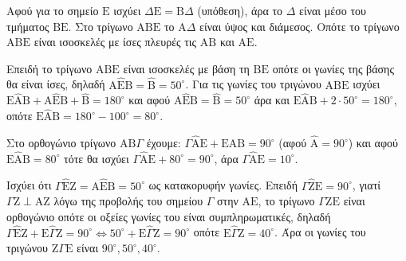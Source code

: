 \begin{alist}
    \item 
    \begin{rlist}
        \item Αφού για το σημείο $\mathrm{E}$ ισχύει $\Delta\mathrm{E} = \mathrm{B}\Delta$ (υπόθεση), άρα το $\Delta$ είναι μέσο του τμήματος $\mathrm{B}\mathrm{E}$. Στο τρίγωνο $\mathrm{A}\mathrm{B}\mathrm{E}$ το $\mathrm{A}\Delta$ είναι ύψος και διάμεσος. Οπότε το τρίγωνο $\mathrm{A}\mathrm{B}\mathrm{E}$ είναι ισοσκελές με ίσες πλευρές τις $\mathrm{A}\mathrm{B}$ και $\mathrm{A}\mathrm{E}$.
        
        \item Επειδή το τρίγωνο $\mathrm{A}\mathrm{B}\mathrm{E}$ είναι ισοσκελές με βάση τη $\mathrm{B}\mathrm{E}$ οπότε οι γωνίες της βάσης θα είναι ίσες, δηλαδή $\mathrm{A}\hat{\mathrm{E}}\mathrm{B} = \hat{\mathrm{B}} = 50^\circ$.
        Για τις γωνίες του τριγώνου $\mathrm{A}\mathrm{B}\mathrm{E}$ ισχύει $\mathrm{E}\hat{\mathrm{A}}\mathrm{B} + \mathrm{A}\hat{\mathrm{E}}\mathrm{B} + \hat{\mathrm{B}} = 180^\circ$ και αφού $\mathrm{A}\hat{\mathrm{E}}\mathrm{B} = \hat{\mathrm{B}} = 50^\circ$ άρα και $\mathrm{E}\hat{\mathrm{A}}\mathrm{B} + 2 \cdot 50^\circ = 180^\circ$, οπότε $\mathrm{E}\hat{\mathrm{A}}\mathrm{B} = 180^\circ - 100^\circ = 80^\circ$.
        
        Στο ορθογώνιο τρίγωνο $\mathrm{A}\mathrm{B}\Gamma$ έχουμε:
        $\Gamma\hat{\mathrm{A}}\mathrm{E} + \mathrm{E}\hat{\mathrm{A}}\mathrm{B} = 90^\circ$ (αφού $\hat{\mathrm{A}} = 90^\circ$) και αφού $\mathrm{E}\hat{\mathrm{A}}\mathrm{B} = 80^\circ$ τότε θα ισχύει $\Gamma\hat{\mathrm{A}}\mathrm{E} + 80^\circ = 90^\circ$, άρα $\Gamma\hat{\mathrm{A}}\mathrm{E} = 10^\circ$.
    \end{rlist}
    
    \item Ισχύει ότι $\Gamma\hat{\mathrm{E}}\mathrm{Z} = \mathrm{A}\hat{\mathrm{E}}\mathrm{B} = 50^\circ$ ως κατακορυφήν γωνίες. Επειδή $\Gamma\hat{\mathrm{Z}}\mathrm{E} = 90^\circ$, γιατί $\Gamma\mathrm{Z} \perp \mathrm{A}\mathrm{Z}$ λόγω της προβολής του σημείου $\Gamma$ στην $\mathrm{A}\mathrm{E}$, το τρίγωνο $\Gamma\mathrm{Z}\mathrm{E}$ είναι ορθογώνιο οπότε οι οξείες γωνίες του είναι συμπληρωματικές, δηλαδή
    $\Gamma\hat{\mathrm{E}}\mathrm{Z} + \mathrm{E}\hat{\Gamma}\mathrm{Z} = 90^\circ \Leftrightarrow 50^\circ + \mathrm{E}\hat{\Gamma}\mathrm{Z} = 90^\circ$ οπότε $\mathrm{E}\hat{\Gamma}\mathrm{Z} = 40^\circ$.
    Άρα οι γωνίες του τριγώνου $\mathrm{Z}\Gamma\mathrm{E}$ είναι $90^\circ, 50^\circ, 40^\circ$.
\end{alist}
